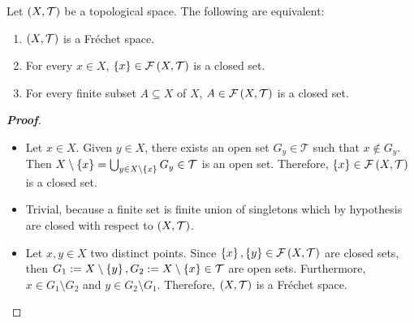 \begin{proposition}
  Let $\left(X,\mathcal{T}\right)$ be a topological space. The following are equivalent:

  \begin{enumerate}
    \item $\left(X,\mathcal{T}\right)$ is a Fréchet space.
    \item For every $x\in X$, $\left\{x\right\}\in\mathcal{F}\left(X,\mathcal{T}\right)$ is a closed set.
    \item For every finite subset $A\subseteq X$ of $X$, $A\in\mathcal{F}\left(X,\mathcal{T}\right)$ is a closed set.
  \end{enumerate}

  \begin{proof}[\rm\textbf{Proof}]
    \hfill
    \begin{itemize}
      \item[\boxed{1\Rightarrow2}] Let $x\in X$. Given $y\in X$, there exists an open set $G_y\in\mathcal{T}$ such that $x\notin G_y$. Then $X\setminus\left\{x\right\}=\bigcup_{y\in X\setminus\left\{x\right\}}{G_y}\in\mathcal{T}$ is an open set. Therefore, $\left\{x\right\}\in\mathcal{F}\left(X,\mathcal{T}\right)$ is a closed set.
      \item[\boxed{2\Rightarrow3}] Trivial, because a finite set is finite union of singletons which by hypothesis are closed with respect to $\left(X,\mathcal{T}\right)$.
      \item[\boxed{3\Rightarrow1}] Let $x,y\in X$ two distinct points. Since $\left\{x\right\},\left\{y\right\}\in\mathcal{F}\left(X,\mathcal{T}\right)$ are closed sets, then $G_1:=X\setminus\left\{y\right\},G_2:=X\setminus\left\{x\right\}\in\mathcal{T}$ are open sets. Furthermore, $x\in G_1\setminus G_2$ and $y\in G_2\setminus G_1$. Therefore, $\left(X,\mathcal{T}\right)$ is a Fréchet space.
    \end{itemize}
  \end{proof}
\end{proposition}


